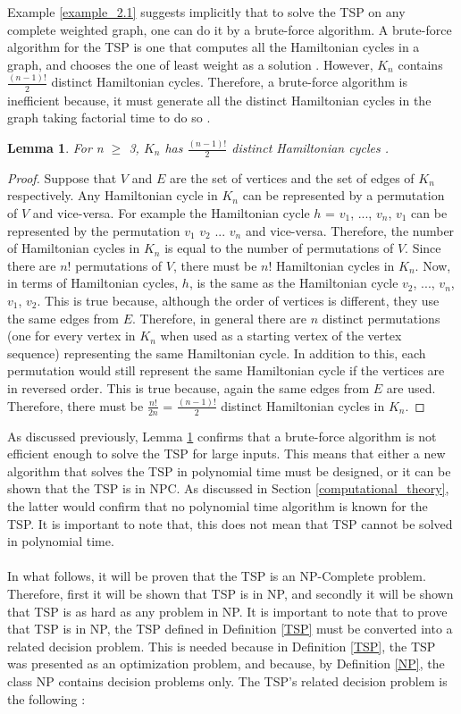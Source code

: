 \documentclass[12pt]{article}
\newtheorem{lemma}[definition]{Lemma}
\numberwithin{equation}{subsection}
\numberwithin{table}{subsection}
\numberwithin{algorithm}{subsection}
\numberwithin{figure}{subsection}
\begin{document}
Example \ref{example_2.1} suggests implicitly that to solve the TSP on any complete weighted graph, one can do it by a brute-force algorithm. A brute-force algorithm for the TSP is one that computes all the Hamiltonian cycles in a graph, and chooses the one of least weight as a solution \cite{Sanchit}. However, $\mathit{K_n}$ contains $\mathit{\frac{(n-1)!}{2}}$ distinct Hamiltonian cycles. Therefore, a brute-force algorithm is inefficient because, it must generate all the distinct Hamiltonian cycles in the graph taking factorial time to do so \cite{Sanchit}. 
\begin{lemma}
\label{distinct_hamiltonian_cycles}
For n $\geq$ 3, $K_n$ has $\frac{(n-1)!}{2}$ distinct Hamiltonian cycles {}. 
\end{lemma}
\begin{proof}
Suppose that $V$ and $E$ are the set of vertices and the set of edges of $K_n$ respectively. Any Hamiltonian cycle in $K_n$ can be represented by a permutation of $V$ and vice-versa. For example the Hamiltonian cycle $h$ = $v_1$, ..., $v_n$, $v_1$ can be represented by the permutation $v_1$ $v_2$ ... $v_n$ and vice-versa. Therefore, the number of Hamiltonian cycles in $K_n$ is equal to the number of permutations of $V$. Since there are $n!$ permutations of $V$, there must be $n!$ Hamiltonian cycles in $K_n$. Now, in terms of Hamiltonian cycles, $h$, is the same as the Hamiltonian cycle $v_2$, ..., $v_n$, $v_1$, $v_2$. This is true because, although the order of vertices is different, they use the same edges from $E$. Therefore, in general there are $n$ distinct permutations (one for every vertex in $K_n$ when used as a starting vertex of the vertex sequence) representing the same Hamiltonian cycle. In addition to this, each permutation would still represent the same Hamiltonian cycle if the vertices are in reversed order. This is true because, again the same edges from $E$ are used. Therefore, there must be $\frac{n!}{2n}$ = $\frac{(n-1)!}{2}$ distinct Hamiltonian cycles in $K_n$.
\end{proof}
As discussed previously, Lemma \ref{distinct_hamiltonian_cycles} confirms that a brute-force algorithm is not efficient enough to solve the TSP for large inputs. This means that either a new algorithm that solves the TSP in polynomial time must be designed, or it can be shown that the TSP is in NPC. As discussed in Section \ref{computational_theory}, the latter would confirm that no polynomial time algorithm is known for the TSP. It is important to note that, this does not mean that TSP cannot be solved in polynomial time.\\\\ In what follows, it will be proven that the TSP is an NP-Complete problem. Therefore, first it will be shown that TSP is in NP, and secondly it will be shown that TSP is as hard as any problem in NP. It is important to note that to prove that TSP is in NP, the TSP defined in Definition \ref{TSP} must be converted into a related decision problem. This is needed because in Definition \ref{TSP}, the TSP was presented as an optimization problem, and because, by Definition \ref{NP}, the class NP contains decision problems only. The TSP's related decision problem is the following :
\end{document}
